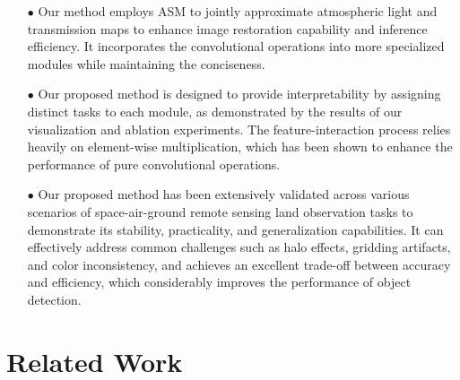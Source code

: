 \documentclass[lettersize,journal]{IEEEtran}
\begin{document}
\begin{itemize}
    \item[$\bullet$] Our method employs ASM to jointly approximate atmospheric light and transmission maps to enhance image restoration capability and inference efficiency. It incorporates the convolutional operations into more specialized modules while maintaining the conciseness.
    \item[$\bullet$] Our proposed method is designed to provide interpretability by assigning distinct tasks to each module, as demonstrated by the results of our visualization and ablation experiments. The feature-interaction process relies heavily on element-wise multiplication, which has been shown to enhance the performance of pure convolutional operations.
    \item[$\bullet$] Our proposed method has been extensively validated across various scenarios of space-air-ground remote sensing land observation tasks to demonstrate its stability, practicality, and generalization capabilities. It can effectively address common challenges such as halo effects, gridding artifacts, and color inconsistency, and achieves an excellent trade-off between accuracy and efficiency, which considerably improves the performance of object detection.

\end{itemize}

\section{Related Work}
\label{sec:2}
\end{document}
